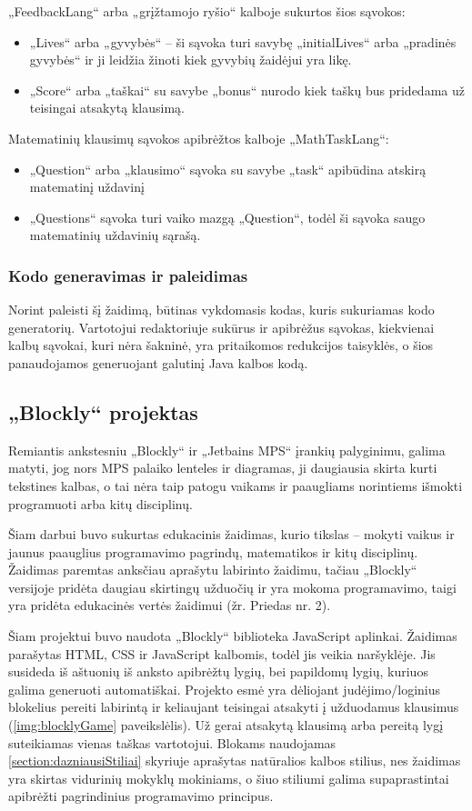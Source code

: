 \documentclass{VUMIFPSkursinis}
\begin{document}
„FeedbackLang“ arba „grįžtamojo ryšio“ kalboje sukurtos šios sąvokos:
\begin{itemize}
    \item „Lives“ arba „gyvybės“ -- ši sąvoka turi savybę „initialLives“ arba „pradinės gyvybės“ ir ji leidžia žinoti kiek gyvybių žaidėjui yra likę.
    \item „Score“ arba „taškai“ su savybe „bonus“ nurodo kiek taškų bus pridedama už teisingai atsakytą klausimą.
\end{itemize}

Matematinių klausimų sąvokos apibrėžtos kalboje „MathTaskLang“:
\begin{itemize}
    \item „Question“ arba „klausimo“ sąvoka su savybe „task“ apibūdina atskirą matematinį uždavinį
    \item „Questions“ sąvoka turi vaiko mazgą „Question“, todėl ši sąvoka saugo matematinių uždavinių sąrašą.
\end{itemize}

\subsubsection{Kodo generavimas ir paleidimas}
Norint paleisti šį žaidimą, būtinas vykdomasis kodas, kuris sukuriamas kodo generatorių. Vartotojui redaktoriuje sukūrus ir apibrėžus sąvokas, kiekvienai kalbų sąvokai, kuri nėra šakninė, yra pritaikomos redukcijos taisyklės, o šios panaudojamos generuojant galutinį Java kalbos kodą.

\subsection{„Blockly“ projektas}

Remiantis ankstesniu „Blockly“ ir „Jetbains MPS“ įrankių palyginimu, galima matyti, jog nors MPS palaiko lenteles ir diagramas, ji daugiausia skirta kurti tekstines kalbas, o tai nėra taip patogu vaikams ir paaugliams norintiems išmokti programuoti arba kitų disciplinų.

Šiam darbui buvo sukurtas edukacinis žaidimas, kurio tikslas -- mokyti vaikus ir jaunus paauglius programavimo pagrindų, matematikos ir kitų disciplinų. Žaidimas paremtas anksčiau aprašytu labirinto žaidimu, tačiau „Blockly“ versijoje pridėta daugiau skirtingų užduočių ir yra mokoma programavimo, taigi yra pridėta edukacinės vertės žaidimui (žr. Priedas nr. 2).

Šiam projektui buvo naudota „Blockly“ biblioteka JavaScript aplinkai. Žaidimas parašytas HTML, CSS ir JavaScript kalbomis, todėl jis veikia naršyklėje. Jis susideda iš aštuonių iš anksto apibrėžtų lygių, bei papildomų lygių, kuriuos galima generuoti automatiškai. Projekto esmė yra dėliojant judėjimo/loginius blokelius pereiti labirintą ir keliaujant teisingai atsakyti į užduodamus klausimus (\ref{img:blocklyGame} paveikslėlis). Už gerai atsakytą klausimą arba pereitą lygį suteikiamas vienas taškas vartotojui. Blokams naudojamas \ref{section:dazniausiStiliai} skyriuje aprašytas natūralios kalbos stilius, nes žaidimas yra skirtas vidurinių mokyklų mokiniams, o šiuo stiliumi galima supaprastintai apibrėžti pagrindinius programavimo principus.
\end{document}
